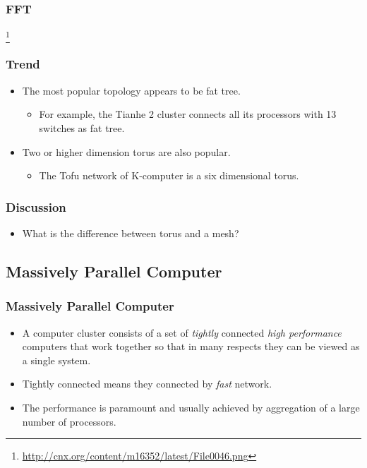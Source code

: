 \documentclass{beamer}
\begin{document}
\begin{CJK}{UTF8}{bsmi}
\begin{frame}
\frametitle{FFT}
\centerline{}
\footnote{\url{http://cnx.org/content/m16352/latest/File0046.png}}
\end{frame}

\begin{frame}
\frametitle{Trend}
\begin{itemize}
\item The most popular topology appears to be fat tree.
\begin{itemize}
\item For example, the Tianhe 2 cluster connects all its processors
  with 13 switches as fat tree.
\end{itemize}
\item Two or higher dimension torus are also popular.
\begin{itemize}
\item The Tofu network of K-computer is a six dimensional torus.
\end{itemize}
\end{itemize}
\end{frame}

\begin{frame}
\frametitle{Discussion}
\begin{itemize}
\item What is the difference between torus and a mesh?
\end{itemize}
\end{frame}

\subsection{Massively Parallel Computer}

\begin{frame}
\frametitle{Massively Parallel Computer}
\begin{itemize}
\item A computer cluster consists of a set of {\em tightly} connected
  {\em high performance} computers that work together so that in many
  respects they can be viewed as a single system.
\item Tightly connected means they connected by {\em fast}
  network.
\item The performance is paramount and usually achieved by
  aggregation of a large number of processors.
\end{itemize}
\end{frame}


\end{CJK}
\end{document}
